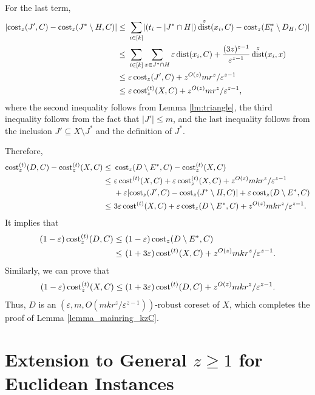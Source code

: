 \documentclass[11pt,letterpaper]{article}
\theoremstyle{definition}
\newcommand{\eps}{\varepsilon}
\DeclareMathOperator{\dist}{dist}
\DeclarePairedDelimiter{\abs}{\lvert}{\rvert}
\begin{document}
    For the last term, 
        \begin{align*}
	\abs{ \cost_z(J',C) - \cost_z(J^\ast\setminus H,C) }
	\leq & \ \sum_{i\in [k]} \abs{(t_i - |J^\ast\cap H|)\dist^z(x_i, C) - \cost_z(E^\ast_i \setminus D_H, C)} \\
    \leq & \ \sum_{i\in [k]} \sum_{x\in J^\ast\cap H} \eps \dist(x_i, C) + \frac{(3z)^{z-1}}{\eps^{z-1}} \dist^z(x_i, x) \\
	\leq & \ \eps \cost_z(J',C) + z^{O(z)} m r^z/\eps^{z-1} \\
     \leq & \ \eps \cost[t]_z(X, C) + z^{O(z)} m r^z/\eps^{z-1},
        \end{align*}
        where the second inequality follows from Lemma \ref{lm:triangle}, the third inequality follows from the fact that \(|J'| \leq m\), and the last inequality follows from the inclusion \(J' \subseteq X\setminus J^\ast\) and the definition of $J^\ast$.
    
	Therefore,
	\begin{align*}
		\cost[t]_z(D,C) - \cost[t]_z(X,C) 
        \leq & \ \cost_z(D\setminus E^\ast,C) - \cost[t]_z(X,C)\\
		\leq & \ \eps \cost^{(t)}(X, C) + \eps \cost[t]_z(X, C) + z^{O(z)} m k r^z/\eps^{z-1} \\
        & \ + \eps \abs{ \cost_z(J',C) - \cost_z(J^\ast\setminus H,C) } + \eps \cost_z(D\setminus E^\ast, C) \\
		\leq & \ 3\eps \cost^{(t)}(X, C) + \eps \cost_z(D\setminus E^\ast, C) + z^{O(z)} m k r^z/\eps^{z-1}. 
	\end{align*}
        It implies that
        \begin{align*}
        (1 - \eps) \cost[t]_z(D,C) \leq & \ (1 - \eps) \cost_z(D\setminus E^\ast, C) \\
        \leq & \ (1 + 3\eps) \cost^{(t)}(X, C) + z^{O(z)} m k r^z/\eps^{z-1}.
        \end{align*}
        Similarly, we can prove that
        \[
        (1 - \eps) \cost[t]_z(X,C) \leq (1 + 3\eps) \cost^{(t)}(D, C) + z^{O(z)} m k r^z/\eps^{z-1}.
        \]
        Thus, $D$ is an $(\eps,m,O(mk r^z/\eps^{z-1}))$-robust coreset of $X$, which completes the proof of Lemma \ref{lemma_mainring_kzC}.
        

\section{Extension to General $z\geq 1$ for Euclidean Instances}
\label{sec:Euc_kzC}
\end{document}
